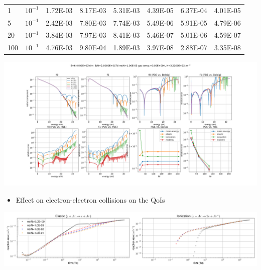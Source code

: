 \documentclass[landscape,archE,fontscale=0.285]{baposter} %
\begin{document}
\begin{poster}
{\begin{minipage}{0.4\textwidth}
{\begin{tabular}{|p{1cm}|p{1cm}|c|c|c|c|c|c|}
			\hline
			1        & $10^{-1}$ & 1.72E-03	& 8.17E-03	& 5.31E-03	& 4.39E-05	& 6.37E-04	& 4.01E-05 \\
			5        & $10^{-1}$ & 2.42E-03	& 7.80E-03	& 7.74E-03	& 5.49E-06	& 5.91E-05	& 4.79E-06 \\
			20       & $10^{-1}$ & 3.84E-03	& 7.97E-03	& 8.41E-03	& 5.46E-07	& 5.01E-06	& 4.59E-07 \\
			100      & $10^{-1}$ & 4.76E-03	& 9.80E-04	& 1.89E-03	& 3.97E-08	& 2.88E-07	& 3.35E-08 \\
			\hline
	\end{tabular}}
	\end{minipage}
	\begin{minipage}{0.6\textwidth}
		\includegraphics[width=\textwidth]{us_vs_bolsig_cg_g0_g2_E643.9999999999999_poly_bspline_sp_4_nr256_qpn_4_bscale1.0_sweeping_Nr_lmax_1_ion_deg_1.00E-03_Tg0.00E+00.png}
	\end{minipage}
	\begin{itemize}
		\item Effect on electron-electron collisions on the QoIs 
	\end{itemize}
	\begin{minipage}{0.99\textwidth}
		\centering
		\includegraphics[width=\textwidth]{effect_of_cc.png}
	\end{minipage}
	\begin{center}
	\begin{minipage}{0.83\textwidth}


\end{minipage}
\end{center}}
\end{poster}
\end{document}
